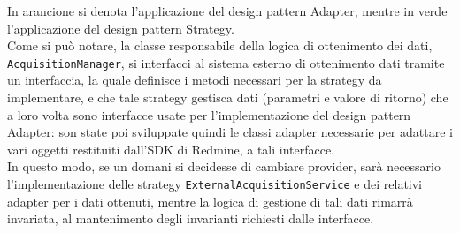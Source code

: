 			In arancione si denota l'applicazione del design pattern Adapter, mentre in verde l'applicazione del design pattern Strategy. \\
			Come si può notare, la classe responsabile della logica di ottenimento dei dati, \texttt{AcquisitionManager}, si interfacci al sistema esterno di ottenimento dati tramite un interfaccia, la quale definisce i metodi necessari per la strategy da implementare, e che tale strategy gestisca dati (parametri e valore di ritorno) che a loro volta sono interfacce usate per l'implementazione del design pattern Adapter: son state poi sviluppate quindi le classi adapter necessarie per adattare i vari oggetti restituiti dall'SDK di Redmine, a tali interfacce.\\
			In questo modo, se un domani si decidesse di cambiare provider, sarà necessario l'implementazione delle strategy \texttt{ExternalAcquisitionService} e dei relativi adapter per i dati ottenuti, mentre la logica di gestione di tali dati rimarrà invariata, al mantenimento degli invarianti richiesti dalle interfacce.\\
